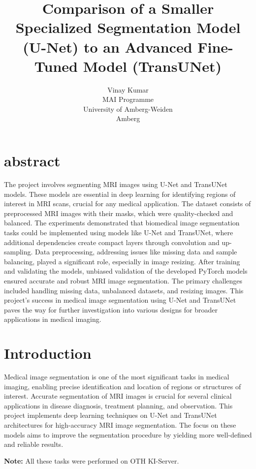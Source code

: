 \documentclass[11pt,a4paper]{article}
\title{Comparison of a Smaller Specialized Segmentation Model (U-Net) to an Advanced Fine-Tuned Model (TransUNet)}
\author{
    Vinay Kumar\\
    MAI Programme\\
    University of Amberg-Weiden\\
    Amberg
}
\begin{document}
\maketitle

\vspace{0.4cm}
\section{abstract}
\raggedright
The project involves segmenting MRI images using U-Net and TransUNet models. These models are essential in deep learning for identifying regions of interest in MRI scans, crucial for any medical application. The dataset consists of preprocessed MRI images with their masks, which were quality-checked and balanced. The experiments demonstrated that biomedical image segmentation tasks could be implemented using models like U-Net and TransUNet, where additional dependencies create compact layers through convolution and up-sampling. Data preprocessing, addressing issues like missing data and sample balancing, played a significant role, especially in image resizing. After training and validating the models, unbiased validation of the developed PyTorch models ensured accurate and robust MRI image segmentation. The primary challenges included handling missing data, unbalanced datasets, and resizing images. This project's success in medical image segmentation using U-Net and TransUNet paves the way for further investigation into various designs for broader applications in medical imaging.

\vspace{0.6cm}
\section{Introduction}
\raggedright
Medical image segmentation is one of the most significant tasks in medical imaging, enabling precise identification and location of regions or structures of interest. Accurate segmentation of MRI images is crucial for several clinical applications in disease diagnosis, treatment planning, and observation. This project implements deep learning techniques on U-Net and TransUNet architectures for high-accuracy MRI image segmentation. The focus on these models aims to improve the segmentation procedure by yielding more well-defined and reliable results.

\vspace{0.4cm}
\textbf{Note:} All these tasks were performed on OTH KI-Server.
\vspace{5.0cm}
\end{document}
